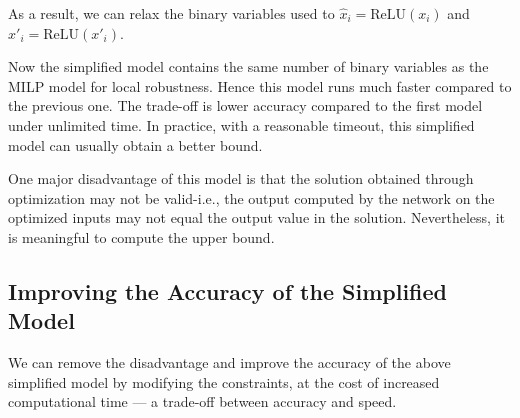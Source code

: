 \documentclass{llncs}
\newcommand{\ReLU}{\mathrm{ReLU}}
\begin{document}
	As a result, we can relax the binary variables used to $\hat{x}_i = \ReLU(x_i)$ and $\hat{x}'_i = \ReLU(x'_i)$.
	
	Now the simplified model contains the same number of binary variables as the MILP model for local robustness. Hence this model runs much faster compared to the previous one. The trade-off is lower accuracy compared to the first model under unlimited time. In practice, with a reasonable timeout, this simplified model can usually obtain a better bound.
	
	One major disadvantage of this model is that the solution obtained through optimization may not be valid-i.e., the output computed by the network on the optimized inputs may not equal the output value in the solution. Nevertheless, it is meaningful to compute the upper bound. 
	
%	
	\subsection{Improving the Accuracy of the Simplified Model}
	We can remove the disadvantage and improve the accuracy of the above simplified model by modifying the constraints, at the cost of increased computational time — a trade-off between accuracy and speed. 
	
	
	
	
%	
%	
	
\end{document}
